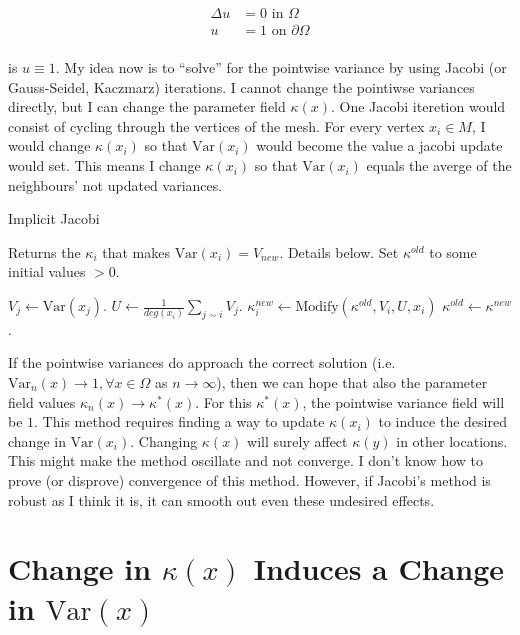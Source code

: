 \documentclass[paper=a4, fontsize=11pt]{scrartcl} %
\numberwithin{equation}{section} %
\numberwithin{figure}{section} %
\numberwithin{table}{section} %
\newcommand{\var}{\text{Var}}
\begin{document}
\begin{align*}
\Delta u &= 0 \text{ in } \Omega\\
 u &= 1 \text{ on } \partial\Omega \\
\end{align*}
 
is $u \equiv 1$. My idea now is to ``solve'' for the pointwise variance
by using Jacobi (or Gauss-Seidel, Kaczmarz) iterations. I cannot change
the pointiwse variances directly, but I can change the parameter
field $\kappa(x)$. One Jacobi iteretion would consist of cycling through the vertices of the mesh.
For every vertex $x_i \in M$, I would change $\kappa(x_i)$ so that $\var(x_i)$ would become the value
a jacobi update would set. This means I change $\kappa(x_i)$ so that $\var(x_i)$ equals
the averge of the neighbours' not updated variances. 

\begin{algorithm}
  \label{pap}
  \caption{Implicit Jacobi}
  \begin{algorithmic}[1]
    \State Returns the $\kappa_i$ that makes $\var(x_i) = V_{new}$. Details below.
    \EndProcedure
    \State Set $\kappa^{old}$ to some initial values $>0$.
   
    
    \State $V_j \gets \var( x_j )$.
    \EndFor
    \State $U \gets \frac{1}{deg(x_i)}\sum_{j \sim i} V_j$.
    \State $\kappa^{new}_i \gets \text{Modify}(\kappa^{old}, V_i, U, x_i)$
    \EndFor
    \State $\kappa^{old} \gets \kappa^{new}$. 
    \EndFor
  \end{algorithmic}
\end{algorithm}

If the pointwise variances do approach the correct solution (i.e. $\var_n(x) \to 1, \forall x\in \Omega$ as $n \to \infty$), then we can
hope that also
the parameter field values $\kappa_n(x) \to \kappa^{*}(x)$. For this $\kappa^{*}(x)$, the pointwise variance field will be $1$.
This method requires finding a way to update $\kappa(x_i)$ to induce the desired change in $\var(x_i)$.
Changing $\kappa(x)$ will surely affect $\kappa(y)$ in other locations. This might make the method oscillate 
and not converge. I don't know how to prove (or disprove) convergence of this method. However,
if Jacobi's method is robust as I think it is, it can smooth out even these undesired effects.

\section{Change in $\kappa(x)$ Induces a Change in $\var(x)$}
\end{document}
